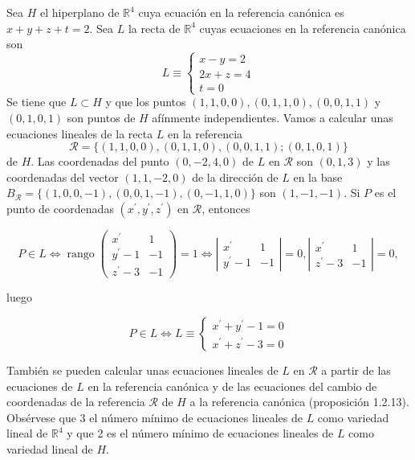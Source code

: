\documentclass[12pt, a4paper, ones, notitlepage, openany,titlepage]{article}
\begin{document}
Sea $H$ el hiperplano de $\mathbb{R}^{4}$ cuya ecuación en la referencia canónica es $x+y+z+t=2$. Sea $L$ la recta de $\mathbb{R}^{4}$ cuyas ecuaciones en la referencia canónica son
$$
L \equiv\left\{\begin{array}{l}
x-y=2 \\
2 x+z=4 \\
t=0
\end{array}\right.
$$
Se tiene que $L \subset H$ y que los puntos $(1,1,0,0),(0,1,1,0),(0,0,1,1)$ y $(0,1,0,1)$ son puntos de $H$ afínmente independientes. Vamos a calcular unas ecuaciones lineales de la recta $L$ en la referencia
$$
\mathcal{R}=\{(1,1,0,0),(0,1,1,0),(0,0,1,1) ;(0,1,0,1)\}
$$
de $H$. Las coordenadas del punto $(0,-2,4,0)$ de $L$ en $\mathcal{R}$ son $(0,1,3)$ y las coordenadas del vector $(1,1,-2,0)$ de la dirección de $L$ en la base $B_{\mathcal{R}}=\{(1,0,0,-1),(0,0,1,-1),(0,-1,1,0)\}$ son $(1,-1,-1)$. Si $P$ es el punto de coordenadas $\left(x^{\prime}, y^{\prime}, z^{\prime}\right)$ en $\mathcal{R}$, entonces

$$
P \in L \Longleftrightarrow \operatorname{rango}\left(\begin{array}{cc}
x^{\prime} & 1 \\
y^{\prime}-1 & -1 \\
z^{\prime}-3 & -1
\end{array}\right)=1 \Longleftrightarrow\left|\begin{array}{cr}
x^{\prime} & 1 \\
y^{\prime}-1 & -1
\end{array}\right|=0,\left|\begin{array}{cr}
x^{\prime} & 1 \\
z^{\prime}-3 & -1
\end{array}\right|=0,
$$

luego

$$
P \in L \Longleftrightarrow L \equiv\left\{\begin{array}{l}
x^{\prime}+y^{\prime}-1=0 \\
x^{\prime}+z^{\prime}-3=0
\end{array}\right.
$$

También se pueden calcular unas ecuaciones lineales de $L$ en $\mathcal{R}$ a partir de las ecuaciones de $L$ en la referencia canónica y de las ecuaciones del cambio de coordenadas de la referencia $\mathcal{R}$ de $H$ a la referencia canónica (proposición 1.2.13). Obsérvese que 3 el número mínimo de ecuaciones lineales de $L$ como variedad lineal de $\mathbb{R}^{4}$ y que 2 es el número mínimo de ecuaciones lineales de $L$ como variedad lineal de $H$.
\end{document}
